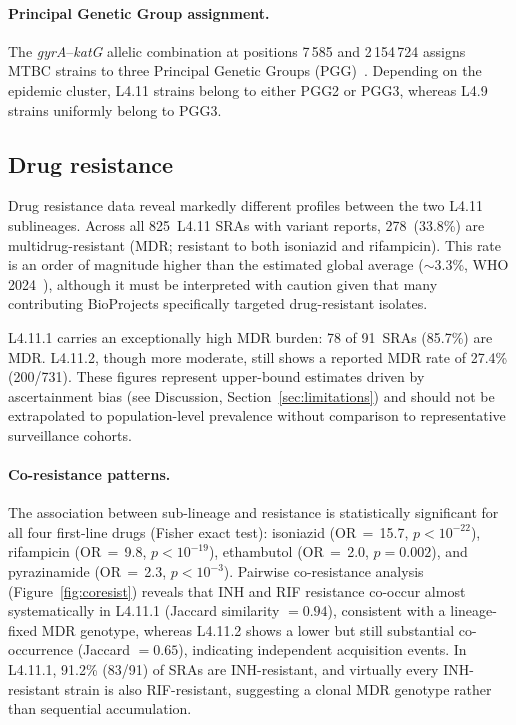 \documentclass[11pt,a4paper]{article}
\newcommand{\lignee}[1]{\textsf{#1}}
\begin{document}
\paragraph{Principal Genetic Group assignment.}
The \textit{gyrA}--\textit{katG} allelic combination at positions 7\,585 and 2\,154\,724 assigns MTBC strains to three Principal Genetic Groups (PGG)~\cite{sreevatsan1997,filliol2006}.  Depending on the epidemic cluster, \lignee{L4.11} strains belong to either PGG2 or PGG3, whereas \lignee{L4.9} strains uniformly belong to PGG3.

\subsection{Drug resistance}

Drug resistance data reveal markedly different profiles between the two \lignee{L4.11}
sublineages.  Across all 825~\lignee{L4.11} SRAs with variant
reports, 278~(33.8\%) are multidrug-resistant (MDR; resistant to both
isoniazid and rifampicin).  This rate is an order of magnitude higher
than the estimated global average ($\sim$3.3\%, WHO 2024~\cite{who2024}),
although it must be interpreted with caution given that many contributing
BioProjects specifically targeted drug-resistant isolates.

\lignee{L4.11.1} carries an exceptionally high MDR burden: 78 of
91~SRAs (85.7\%) are MDR\@.  \lignee{L4.11.2}, though more moderate,
still shows a reported MDR rate of 27.4\% (200/731).  These figures
represent upper-bound estimates driven by ascertainment bias (see
Discussion, Section~\ref{sec:limitations}) and should not be
extrapolated to population-level prevalence without comparison to
representative surveillance cohorts.

\paragraph{Co-resistance patterns.}

The association between sub-lineage and resistance is statistically
significant for all four first-line drugs (Fisher exact test):
isoniazid (OR\,$=$\,15.7, $p < 10^{-22}$),
rifampicin (OR\,$=$\,9.8, $p < 10^{-19}$),
ethambutol (OR\,$=$\,2.0, $p = 0.002$),
and pyrazinamide (OR\,$=$\,2.3, $p < 10^{-3}$).
Pairwise co-resistance analysis (Figure~\ref{fig:coresist}) reveals that
INH and RIF resistance co-occur almost systematically in \lignee{L4.11.1}
(Jaccard similarity $= 0.94$), consistent with a lineage-fixed MDR
genotype, whereas \lignee{L4.11.2} shows a lower but still substantial
co-occurrence (Jaccard $= 0.65$), indicating independent acquisition
events.  In \lignee{L4.11.1}, 91.2\% (83/91) of SRAs are INH-resistant,
and virtually every INH-resistant strain is also RIF-resistant,
suggesting a clonal MDR genotype rather than sequential accumulation.
\end{document}
